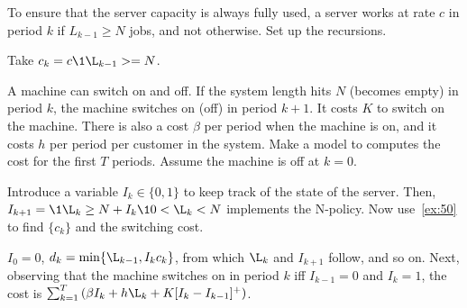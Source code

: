 \begin{exercise}\label{ex:50}
To ensure that the server capacity is always fully used, 
a server  works at rate $c$ in period $k$  if $L_{k-1}\geq N$ jobs, and not otherwise.
Set up the recursions.
\begin{solution}
Take $c_k = c\1{\L_{k-1} >= N}$.
\end{solution}
\end{exercise}


\begin{exercise}\label{ex:n-policies}
A machine  can switch on and off.
 If the system length hits $N$ (becomes empty) in period $k$, the machine switches on (off) in period $k+1$.
 It costs $K$ to switch on the machine.
 There is also a cost $\beta$ per period when the machine is on, and it costs $h$ per period per customer in the system.
Make a  model to  computes the cost for the first $T$ periods.
Assume the machine is  off at $k=0$.
\begin{hint}
  Introduce a variable $I_k\in\{0, 1\}$ to keep track of the state of the server.
  Then, $I_{k+1} = \1{\L_k\geq N} + I_k \1{0<\L_k<N}$ implements the N-policy.
  Now use~\cref{ex:50} to find $\{c_k\}$ and the switching cost.
\end{hint}
\begin{solution}
$I_0 = 0$,  $d_k =\min\{\L_{k-1}, I_k c_k\}$, from which
$\L_k$ and $I_{k+1}$ follow, and so on. Next,
 observing that the machine  switches on in period $k$ iff
$I_{k-1} = 0$ and $I_k=1$, the cost is $\sum_{k=1}^T \left(\beta I_k + h \L_k + K[I_k - I_{k-1}]^+\right)$.
\end{solution}
\end{exercise}


